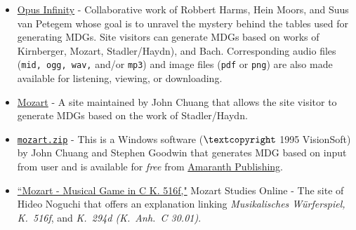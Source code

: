 \documentclass[letterpaper,x11names,svgnames,10pt]{article}
\begin{document}
{\begin{itemize}
	\item \hyperref{https://opus-infinity.org}{}{}{Opus Infinity} - Collaborative work of Robbert Harms, Hein Moors, and Suus van Petegem whose goal is to unravel the mystery behind the tables used for generating MDGs.  Site visitors can generate MDGs based on works of Kirnberger, Mozart, Stadler/Haydn), and Bach.  Corresponding audio files ({\tt mid, ogg, wav,} and/or {\tt mp3}) and image files ({\tt pdf} or {\tt png}) are also made available for listening, viewing, or downloading.
	
	\item  \hyperref{http://sunsite.univie.ac.at/Mozart/dice/}{}{}{Mozart} - A site maintained by John Chuang that allows the site visitor to generate MDGs based on the work of Stadler/Haydn.
 	
 	\item \hyperref{http://www.amaranthpublishing.com/MozartDiceGame.htm}{}{}{\tt mozart.zip} -  This is a Windows software ($\textcopyright$ 1995 VisionSoft) by John Chuang and Stephen Goodwin that generates MDG based on input from user and is available for {\it free} from  \hyperref{http://www.amaranthpublishing.com/MozartDiceGame.htm}{}{}{Amaranth Publishing}.  
 	
 	\item \hyperref{(http://www.asahi-net.or.jp/\~rb5h-ngc/e/k516f.htm}{}{}{``Mozart - Musical Game in C K. 516f,"}	Mozart Studies Online - The site of Hideo Noguchi that offers an explanation linking {\em Musikalisches W\"{u}rferspiel, K.\ 516f}, and  {\em K.\ 294d (K.\ Anh.\ C 30.01)}. 
\end{itemize}

}
\end{document}
